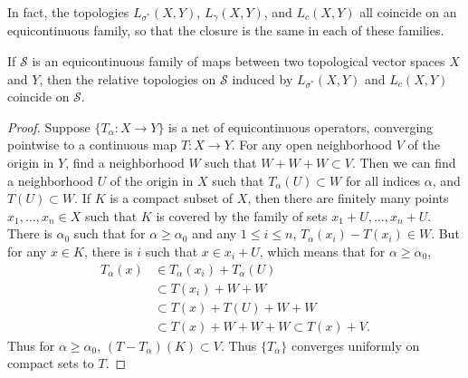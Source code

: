 In fact, the topologies $L_{\sigma^*}(X,Y)$, $L_\gamma(X,Y)$, and $L_c(X,Y)$ all coincide on an equicontinuous family, so that the closure is the same in each of these families.

\begin{theorem}
    If $\mathcal{S}$ is an equicontinuous family of maps between two topological vector spaces $X$ and $Y$, then the relative topologies on $\mathcal{S}$ induced by $L_{\sigma^*}(X,Y)$ and $L_c(X,Y)$ coincide on $\mathcal{S}$.
\end{theorem}
\begin{proof}
    Suppose $\{ T_\alpha: X \to Y \}$ is a net of equicontinuous operators, converging pointwise to a continuous map $T: X \to Y$. For any open neighborhood $V$ of the origin in $Y$, find a neighborhood $W$ such that $W + W + W \subset V$. Then we can find a neighborhood $U$ of the origin in $X$ such that $T_\alpha(U) \subset W$ for all indices $\alpha$, and $T(U) \subset W$. If $K$ is a compact subset of $X$, then there are finitely many points $x_1,\dots,x_n \in X$ such that $K$ is covered by the family of sets $x_1 + U, \dots, x_n + U$. There is $\alpha_0$ such that for $\alpha \geq \alpha_0$ and any $1 \leq i \leq n$, $T_\alpha(x_i) - T(x_i) \in W$. But for any $x \in K$, there is $i$ such that $x \in x_i + U$, which means that for $\alpha \geq \alpha_0$,
    \begin{align*}
        T_\alpha(x) &\in T_\alpha(x_i) + T_\alpha(U)\\
        &\subset T(x_i) + W + W\\
        &\subset T(x) + T(U) + W + W\\
        &\subset T(x) + W + W + W \subset T(x) + V.
    \end{align*}
    Thus for $\alpha \geq \alpha_0$, $(T - T_\alpha)(K) \subset V$. Thus $\{ T_\alpha \}$ converges uniformly on compact sets to $T$.
\end{proof}

